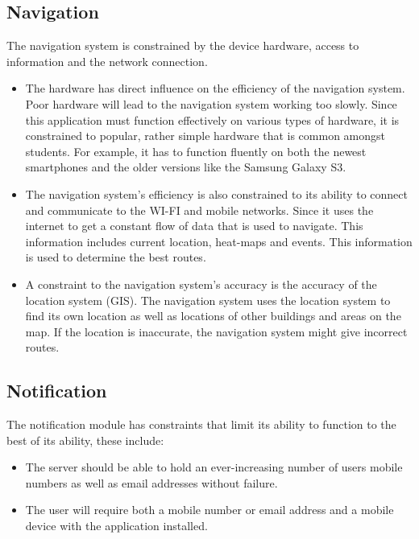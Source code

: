 \documentclass[runningheads,a4paper]{article}
\begin{document}
\subsection{Navigation}

The navigation system is constrained by the device hardware, access to information and the network connection.

\begin{itemize}
\item The hardware has direct influence on the efficiency of the navigation system. Poor hardware will lead to the navigation system working too slowly. Since this application must function effectively on various types of hardware, it is constrained to popular, rather simple hardware that is common amongst students. For example, it has to function fluently on both the newest smartphones and the older versions like the Samsung Galaxy S3.

\item The navigation system’s efficiency is also constrained to its ability to connect and communicate to the WI-FI and mobile networks. Since it uses the internet to get a constant flow of data that is used to navigate. This information includes current location, heat-maps and events. This information is used to determine the best routes.

\item A constraint to the navigation system’s accuracy is the accuracy of the location system (GIS). The navigation system uses the location system to find its own location as well as locations of other buildings and areas on the map. If the location is inaccurate, the navigation system might give incorrect routes. 

\end{itemize}

\subsection{Notification}
The notification module has constraints that limit its ability to function to the best of its ability, these include:

\begin{itemize}
\item The server should be able to hold an ever-increasing number of users mobile numbers as well as email addresses without failure.  

\item The user will require both a mobile number or email address and a mobile device with the application installed.
\end{itemize}
\end{document}
